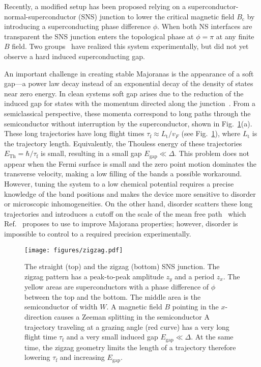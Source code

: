 \documentclass[english, twocolumn, 10pt, aps, superscriptaddress, floatfix, prb, citeautoscript]{revtex4-1}
\renewcommand{\comment}[2]{#2}
\begin{document}
\comment{SNS junctions also work and require smaller field.}
Recently, a modified setup has been proposed\cite{Pientka2017,Hell2017} relying on a superconductor-normal-superconductor (SNS) junction to lower the critical magnetic field $B_\textrm{c}$ by introducing a superconducting phase difference $\phi$.
When both NS interfaces are transparent the SNS junction enters the topological phase at $\phi=\pi$ at any finite $B$ field.
Two groups~\cite{Fornieri2018,Ren2018} have realized this system experimentally, but did not yet observe a hard induced superconducting gap.

\comment{The gap is small because of long trajectories.}
An important challenge in creating stable Majoranas is the appearance of a soft gap---a power law decay instead of an exponential decay of the density of states near zero energy.
In clean systems soft gap arises due to the reduction of the induced gap for states with the momentum directed along the junction~\cite{Gennes1963,Beenakker2005}.
From a semiclassical perspective, these momenta correspond to long paths through the semiconductor without interruption by the superconductor, shown in Fig.~\ref{fig:setup}(a).
These long trajectories have long flight times $\tau_\textrm{f} \approx L_\textrm{t} / v_F$ (see Fig.~\ref{fig:setup}), where $L_\textrm{t}$ is the trajectory length.
Equivalently, the Thouless energy of these trajectories $E_{\textrm{Th}}=\hbar / \tau_\textrm{f}$ is small, resulting in a small gap $E_\textrm{gap} \ll \Delta$.
This problem does not appear when the Fermi surface is small and the zero point motion dominates the transverse velocity, making a low filling of the bands a possible workaround\cite{Beenakker2005,Nijholt2015}.
However, tuning the system to a low chemical potential requires a precise knowledge of the band positions and makes the device more sensitive to disorder or microscopic inhomogeneities.
On the other hand, disorder scatters these long trajectories and introduces a cutoff on the scale of the mean free path~\cite{Golubov1988,Belzig1996,Pilgram2000} which Ref.~ proposes to use to improve Majorana properties; however, disorder is impossible to control to a required precision experimentally.

\begin{figure}[!htb]
\centering
\texttt{[image: figures/zigzag.pdf]}
\caption{The straight (top) and the zigzag (bottom) SNS junction.
The zigzag pattern has a peak-to-peak amplitude $z_y$ and a period $z_x$.
The yellow areas are superconductors with a phase difference of $\phi$ between the top and the bottom.
The middle area is the semiconductor of width $W$.
A magnetic field $B$ pointing in the $x$-direction causes a Zeeman splitting in the semiconductor
A trajectory traveling at a grazing angle (red curve) has a very long flight time $\tau_\textrm{f}$ and a very small induced gap $E_\textrm{gap} \ll \Delta$.
At the same time, the zigzag geometry limits the length of a trajectory therefore lowering $\tau_\textrm{f}$ and increasing $E_\textrm{gap}$.
\label{fig:setup}}
\end{figure}
\end{document}
